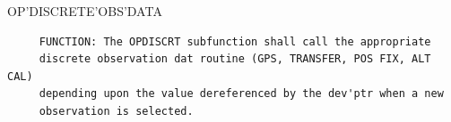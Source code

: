 \begin{frame}
OP'DISCRETE'OBS'DATA
\begin{verbatim}
     FUNCTION: The OPDISCRT subfunction shall call the appropriate
     discrete observation dat routine (GPS, TRANSFER, POS FIX, ALT CAL)
     depending upon the value dereferenced by the dev'ptr when a new
     observation is selected.

\end{verbatim}
\end{frame}
